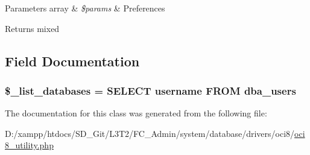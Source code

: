 \begin{DoxyParams}[1]{Parameters}
array & {\em \$params} & Preferences \\
\hline
\end{DoxyParams}
\begin{DoxyReturn}{Returns}
mixed 
\end{DoxyReturn}


\subsection{Field Documentation}
\hypertarget{class_c_i___d_b__oci8__utility_afe3a5b80562d93d6bc7e2b53c95b7e5a}{}
\subsubsection[{\$\+\_\+list\+\_\+databases}]{\setlength{\rightskip}{0pt plus 5cm}\$\+\_\+list\+\_\+databases = \textquotesingle{}S\+E\+L\+E\+C\+T username F\+R\+O\+M dba\+\_\+users\textquotesingle{}\hspace{0.3cm}{\ttfamily [protected]}}\label{class_c_i___d_b__oci8__utility_afe3a5b80562d93d6bc7e2b53c95b7e5a}


The documentation for this class was generated from the following file\+:\begin{DoxyCompactItemize}
\item 
D\+:/xampp/htdocs/\+S\+D\+\_\+\+Git/\+L3\+T2/\+F\+C\+\_\+\+Admin/system/database/drivers/oci8/\hyperlink{oci8__utility_8php}{oci8\+\_\+utility.\+php}\end{DoxyCompactItemize}

